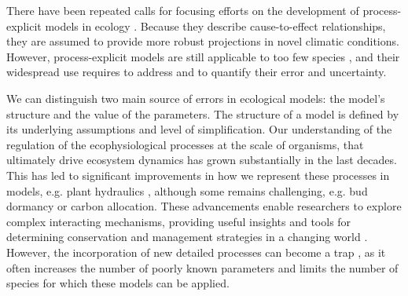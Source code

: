 \documentclass[letterpaper,8pt]{extarticle}  %
\begin{document}
\begin{doublespacing}
\begin{linenumbers}


There have been repeated calls for focusing efforts on the development of process-explicit models in ecology \citep{Urban2016, Singer2016, Pilowsky2022}. Because they describe cause-to-effect relationships, they are assumed to provide more robust projections in novel climatic conditions. However, process-explicit models are still applicable to too few species \citep{Evans2016}, and their widespread use requires to address and to quantify their error and uncertainty.

We can distinguish two main source of errors in ecological models: the model's structure and the value of the parameters. The structure of a model is defined by its underlying assumptions and level of simplification. Our understanding of the regulation of the ecophysiological processes at the scale of organisms, that ultimately drive  ecosystem dynamics has grown substantially in the last decades. This has led to significant improvements in how we represent these processes in models, e.g. plant hydraulics \citep{Ruffault2022} , although some remains challenging, e.g. bud dormancy \citep{Chuine2016} or carbon allocation. 
These advancements enable researchers to explore complex interacting mechanisms, providing useful insights and tools for determining conservation and management strategies in a changing world \citep{Urban2016}. However, the incorporation of new detailed processes can become a trap \citep{Franklin2020}, as it often increases the number of poorly known parameters and limits the number of species for which these models can be applied. %


\end{linenumbers}
\end{doublespacing}
\end{document}
